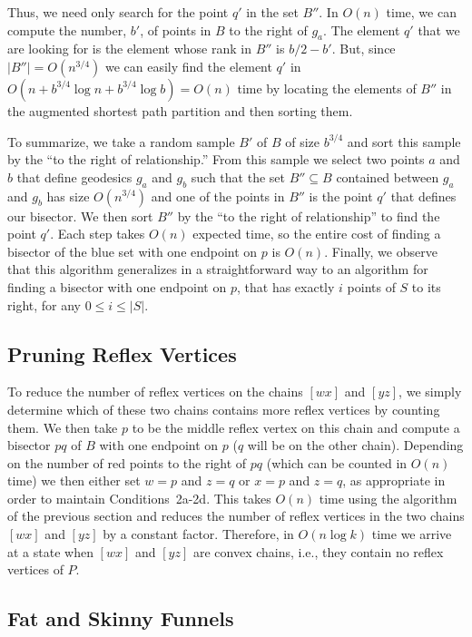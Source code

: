 \documentclass[charterfonts,lotsofwhite]{patmorin}
\newcommand{\chain}[2]{[#1#2]}
\begin{document}
Thus, we need only search for the point $q'$ in the set $B''$.  In
$O(n)$ time, we can compute the number, $b'$, of points in $B$ to the
right of $g_a$.  The element $q'$ that we are looking for is the
element whose rank in $B''$ is $b/2-b'$.  But, since
$|B''|=O(n^{3/4})$ we can easily find the element $q'$ in
$O(n+b^{3/4}\log n+b^{3/4}\log b) = O(n)$ time by locating the
elements of $B''$ in the augmented shortest path partition and then
sorting them. 

To summarize, we take a random sample $B'$ of $B$ of size $b^{3/4}$
and sort this sample by the ``to the right of relationship.''  From
this sample we select two points $a$ and $b$ that define geodesics
$g_a$ and $g_b$ such that the set $B''\subseteq B$ contained between
$g_a$ and $g_b$ has size $O(n^{3/4})$ and one of the points in $B''$
is the point  $q'$ that defines our bisector.  We then sort $B''$ by
the ``to the right of relationship'' to find the point $q'$.  Each
step takes $O(n)$ expected time, so the entire cost of finding a
bisector of the blue set with one endpoint on $p$ is $O(n)$.  Finally,
we observe that this algorithm generalizes in a straightforward way to
an algorithm for finding a bisector with one endpoint on $p$, that has
exactly $i$ points of $S$ to its right, for any $0\le i\le |S|$.

\subsection{Pruning Reflex Vertices}

To reduce the number of reflex vertices on the chains $\chain{w}{x}$
and $\chain{y}{z}$, we simply determine which of these two chains
contains more reflex vertices by counting them.  We then take $p$ to
be the middle reflex vertex on this chain and compute a bisector $pq$
of $B$ with one endpoint on $p$ ($q$ will be on the other chain).
Depending on the number of red points to the right of $pq$ (which can
be counted in $O(n)$ time) we then either set $w=p$ and $z=q$ or $x=p$
and $z=q$, as appropriate in order to maintain Conditions~2a-2d.  This
takes $O(n)$ time using the algorithm of the previous section and
reduces the number of reflex vertices in the two chains $\chain{w}{x}$
and $\chain{y}{z}$ by a constant factor.  Therefore, in $O(n\log k)$
time we arrive at a state when $\chain{w}{x}$ and $\chain{y}{z}$ are
convex chains, i.e., they contain no reflex vertices of $P$.

\subsection{Fat and Skinny Funnels}
\end{document}
